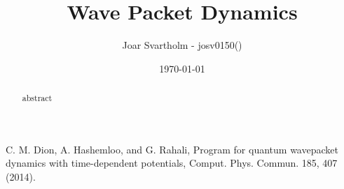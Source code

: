 

  \title{Wave Packet Dynamics}

  \author{
    Joar Svartholm - josv0150()\\
  }
  \date{\today}

\begin{titlepage}
  \maketitle
  \thispagestyle{fancy}
  \headheight 35pt
  \rhead{\small\today}

\begin{abstract}
  abstract

\end{abstract}


\end{titlepage}


\newpage
\pagestyle{fancy}
\headheight 30pt
\rhead{\small \myTitle}
\lhead{\small \myAuthor \today}
\cfoot{\thepage}

\tableofcontents
\newpage







\begin{thebibliography}{R}
  C. M. Dion, A. Hashemloo, and G. Rahali, Program for quantum wavepacket
dynamics with time-dependent potentials, Comput. Phys. Commun.
185, 407 (2014).
\end{thebibliography}

